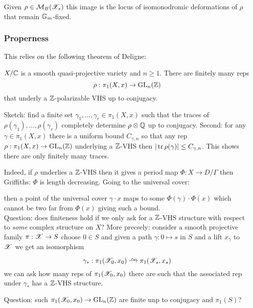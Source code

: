 \documentclass[12pt]{article}
\begin{document}
Given $\rho \in \mathcal{M}_B(\mathscr{X}_s)$ this image is the locus of isomonodromic deformations of $\rho$ that remain $\mathbb{G}_m$-fixed.

\subsubsection{Properness}

This relies on the following theorem of Deligne:

\begin{theorem}
$X/\mathbb{C}$ is a smooth quasi-projective variety and $n \ge 1$. There are finitely many reps
\[ \rho : \pi_1(X, x) \to \mathrm{GL}_n(\mathbb{Z}) \]
that underly a $\mathbb{Z}$-polarizable VHS up to conjugacy. 
\end{theorem}

Sketch: find a finite set $\gamma_1, \dots, \gamma_r \in \pi_1(X, x)$ such that the traces of $\rho(\gamma_1), \dots, \rho(\gamma_r)$ completely determine $\rho \otimes \mathbb{Q}$ up to conjugacy. Second: for any $\gamma \in \pi_1(X, x)$ there is a uniform bound $C_{\gamma, n}$ so that any rep $\rho : \pi_1(X, x) \to \mathrm{GL}_n(\mathbb{Z})$ underlying a $\mathbb{Z}$-VHS then $|\operatorname{\mathrm{tr}}{\rho(\gamma)}| \le C_{\gamma, n}$. This shows there are only finitely many traces. 

Indeed, if $\rho$ underlies a $\mathbb{Z}$-VHS then it gives a period map $\Phi : X \to D / \Gamma$ then Griffiths: $\Phi$ is length decreasing. Going to the universal cover:
\begin{center}
\end{center}
then a point of the universal cover $\gamma \cdot x$ maps to some $\Phi(\gamma) \cdot \Phi(x)$ which cannot be two far from $\Phi(x)$ giving such a bound.
\\
Question: does finiteness hold if we only ask for a $\mathbb{Z}$-VHS structure with respect to \textit{some} complex structure on $X$? More precsely: consider a smooth projective family $\pi : \mathscr{X} \to S$ choose $0 \in S$ and given a path $\gamma : 0 \mapsto s$ in $S$ and a lift $x_\gamma$ to $\mathscr{X}$ we get an isomorphism
\[ \gamma_* : \pi_1(\X_0, x_0) \iso \pi_1(\X_s, x_s) \] 
we can ask how many reps of $\pi_1(\mathscr{X}_0, x_0)$ there are such that the associated rep under $\gamma_*$ has a $\mathbb{Z}$-VHS structure. 

Question: such $\pi_1(\mathscr{X}_0, x_0) \to \mathrm{GL}_n(\mathbb{Z})$ are finite unp to conjugacy and $\pi_1(S)$? 
\end{document}
